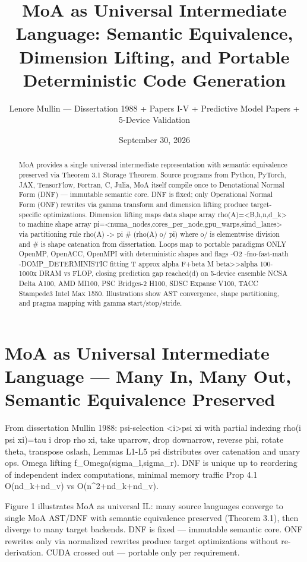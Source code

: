 \documentclass[11pt,a4paper]{article}
\title{MoA as Universal Intermediate Language: Semantic Equivalence, Dimension Lifting, and Portable Deterministic Code Generation}
\author{Lenore Mullin — Dissertation 1988 + Papers I-V + Predictive Model Papers + 5-Device Validation}
\date{September 30, 2026}
\begin{document}
\maketitle
\begin{abstract}
MoA provides a single universal intermediate representation with semantic equivalence preserved via Theorem 3.1 Storage Theorem. Source programs from Python, PyTorch, JAX, TensorFlow, Fortran, C, Julia, MoA itself compile once to Denotational Normal Form (DNF) — immutable semantic core. DNF is fixed; only Operational Normal Form (ONF) rewrites via gamma transform and dimension lifting produce target-specific optimizations. Dimension lifting maps data shape array rho(A)=<B,h,n,d\_k> to machine shape array pi=<numa\_nodes,cores\_per\_node,gpu\_warps,simd\_lanes> via partitioning rule rho(A) -> pi \# (rho(A) o/ pi) where o/ is elementwise division and \# is shape catenation from dissertation. Loops map to portable paradigms ONLY OpenMP, OpenACC, OpenMPI with deterministic shapes and flags -O2 -fno-fast-math -DOMP\_DETERMINISTIC fitting T approx alpha F+beta M beta>>alpha 100-1000x DRAM vs FLOP, closing prediction gap reached(d) on 5-device ensemble NCSA Delta A100, AMD MI100, PSC Bridges-2 H100, SDSC Expanse V100, TACC Stampede3 Intel Max 1550. Illustrations show AST convergence, shape partitioning, and pragma mapping with gamma start/stop/stride.
\end{abstract}

\section{MoA as Universal Intermediate Language — Many In, Many Out, Semantic Equivalence Preserved}

From dissertation Mullin 1988: psi-selection <i>psi xi with partial indexing rho(i psi xi)=tau i drop rho xi, take uparrow, drop downarrow, reverse phi, rotate theta, transpose oslash, Lemmas L1-L5 psi distributes over catenation and unary ops. Omega lifting f\_Omega(sigma\_l,sigma\_r). DNF is unique up to reordering of independent index computations, minimal memory traffic Prop 4.1 O(nd\_k+nd\_v) vs O(n^2+nd\_k+nd\_v).

Figure 1 illustrates MoA as universal IL: many source languages converge to single MoA AST/DNF with semantic equivalence preserved (Theorem 3.1), then diverge to many target backends. DNF is fixed — immutable semantic core. ONF rewrites only via normalized rewrites produce target optimizations without re-derivation. CUDA crossed out — portable only per requirement.
\end{document}
